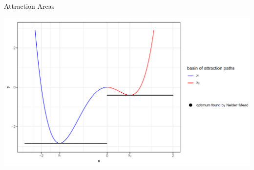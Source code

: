 \documentclass[11pt,compress,t,notes=noshow, xcolor=table]{beamer}
\begin{document}
\begin{vbframe}{Attraction Areas}

\begin{center}
\includegraphics[width=1\textwidth]{figure_man/example-nelder.png}
\end{center}




\end{vbframe}
\end{document}
